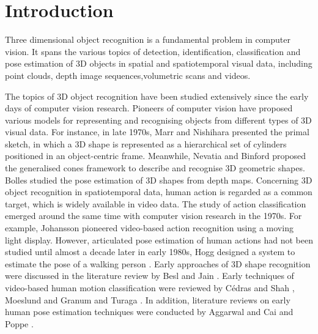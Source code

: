 \chapter{Introduction}
\label{chap/intro} 

Three dimensional object recognition is a fundamental problem in computer vision. It spans the various topics of detection, identification, classification and pose estimation of 3D objects in spatial and spatiotemporal visual data, including point clouds, depth image sequences,volumetric scans and videos.


The topics of 3D object recognition have been studied extensively since the early days of computer vision research. 
Pioneers of computer vision have proposed various models for representing and recognising objects from different types of 3D visual data.
For instance, in late 1970s, Marr and Nishihara \cite{Marr1978} presented the primal sketch, in which a 3D shape is represented as a hierarchical set of cylinders positioned in an object-centric frame. 
Meanwhile, Nevatia and Binford \cite{Nevatia1977} proposed the generalised cones framework to describe and recognise 3D geometric shapes. Bolles \etal \cite{Bolles1983} studied the pose estimation of 3D shapes from depth maps.  
Concerning 3D object recognition in spatiotemporal data, human action is regarded as a common target, which is widely available in video data. The study of action classification emerged around the same time with computer vision research in the 1970s. For example, Johansson \cite{Johansson1973} pioneered video-based action recognition using a moving light display. However, articulated pose estimation of human actions had not been studied until almost a decade later in early 1980s, \eg Hogg designed a system to estimate the pose of a walking person \cite{Hogg1983}. 
Early approaches of 3D shape recognition were discussed in the literature review by Besl and Jain \cite{Besl1985}. Early techniques of video-based human motion classification were reviewed by C\'edras and Shah \cite{Cedras1995}, Moeslund and Granum \cite{Moeslund2001} and Turaga \etal \cite{Turaga2008}. In addition, literature reviews on early human pose estimation techniques were conducted by Aggarwal and Cai \cite{Aggarwal1999} and Poppe \cite{Poppe2007}.  

